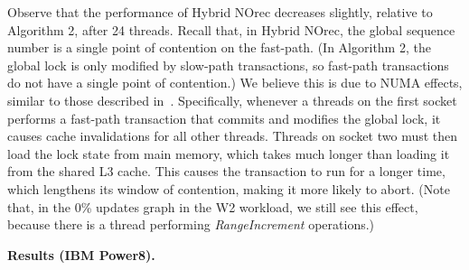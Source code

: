 Observe that the performance of Hybrid NOrec decreases slightly, relative to Algorithm 2, after 24 threads.
Recall that, in Hybrid NOrec, the global sequence number is a single point of contention on the fast-path.
(In Algorithm 2, the global lock is only modified by slow-path transactions, so fast-path transactions do not have a single point of contention.)
We believe this is due to NUMA effects, similar to those described in~\cite{BKLL16}.
Specifically, whenever a threads on the first socket performs a fast-path transaction that commits and modifies the global lock, it causes cache invalidations for all other threads.
Threads on socket two must then load the lock state from main memory, which takes much longer than loading it from the shared L3 cache.
This causes the transaction to run for a longer time, which lengthens its window of contention, making it more likely to abort.
(Note that, in the 0\% updates graph in the W2 workload, we still see this effect, because there is a thread performing \textit{RangeIncrement} operations.)

\vspace{1mm}\noindent\textbf{Results (IBM Power8).}
